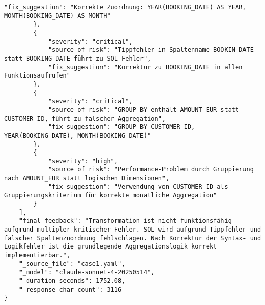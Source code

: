 \begin{lstlisting}[caption={Ausgabe: Claude Sonnet 4 Anwendungsfall 1 Konsistenzdurchlauf},label={claude_case1_prompt2}]
            "fix_suggestion": "Korrekte Zuordnung: YEAR(BOOKING_DATE) AS YEAR, MONTH(BOOKING_DATE) AS MONTH"
        },
        {
            "severity": "critical",
            "source_of_risk": "Tippfehler in Spaltenname BOOKIN_DATE statt BOOKING_DATE führt zu SQL-Fehler",
            "fix_suggestion": "Korrektur zu BOOKING_DATE in allen Funktionsaufrufen"
        },
        {
            "severity": "critical",
            "source_of_risk": "GROUP BY enthält AMOUNT_EUR statt CUSTOMER_ID, führt zu falscher Aggregation",
            "fix_suggestion": "GROUP BY CUSTOMER_ID, YEAR(BOOKING_DATE), MONTH(BOOKING_DATE)"
        },
        {
            "severity": "high",
            "source_of_risk": "Performance-Problem durch Gruppierung nach AMOUNT_EUR statt logischen Dimensionen",
            "fix_suggestion": "Verwendung von CUSTOMER_ID als Gruppierungskriterium für korrekte monatliche Aggregation"
        }
    ],
    "final_feedback": "Transformation ist nicht funktionsfähig aufgrund multipler kritischer Fehler. SQL wird aufgrund Tippfehler und falscher Spaltenzuordnung fehlschlagen. Nach Korrektur der Syntax- und Logikfehler ist die grundlegende Aggregationslogik korrekt implementierbar.",
    "_source_file": "case1.yaml",
    "_model": "claude-sonnet-4-20250514",
    "_duration_seconds": 1752.08,
    "_response_char_count": 3116
}
\end{lstlisting}

